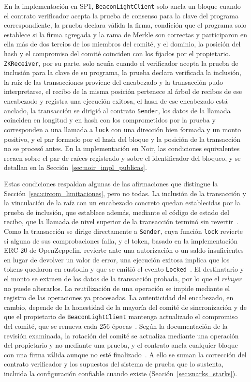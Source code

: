 En la implementación en SP1, \texttt{BeaconLightClient} solo ancla un bloque cuando el contrato
verificador acepta la prueba de consenso para la clave del programa correspondiente, la prueba declara válida la firma, condición
que el programa solo establece si la firma agregada y la rama de Merkle son correctas y
participaron en ella más de dos tercios de los miembros del comité, y el dominio, la posición del
hash y el compromiso del comité coinciden con los fijados por el propietario. \texttt{ZKReceiver}, por su parte, solo acuña cuando el verificador acepta la
prueba de inclusión para la clave de su programa, la prueba declara verificada la inclusión, la
raíz de las transacciones proviene del encabezado y la transacción pudo interpretarse, el recibo
de la misma posición pertenece al árbol de recibos de ese encabezado y registra una ejecución
exitosa, el hash de ese encabezado está anclado, la transacción se dirigió al contrato \texttt{Sender}, los datos de
la llamada coinciden en longitud y en hash con los comprometidos por la prueba y corresponden a
una llamada a \texttt{lock} con una dirección bien formada y un monto positivo, y el par formado
por el hash del bloque y la posición de la transacción no se procesó antes. En la implementación
en Noir, las condiciones equivalentes recaen sobre el par de raíces registrado y sobre el
identificador del bloqueo, y se detallan en la Sección~\ref{sec:noir_impl_publicas}.

Estas condiciones respaldan algunas de las afirmaciones que distingue la
Sección~\ref{sec:circom_limitaciones}, pero no todas. La inclusión de la transacción y la
vinculación de la raíz con un encabezado concreto quedan establecidas por la prueba de inclusión,
que establece además, mediante el código de estado del recibo, que la llamada de nivel superior
de la transacción terminó sin revertir~\cite{eip658}. Como la transacción se dirige directamente
a \texttt{Sender}, cuya función \texttt{lock} revierte si alguna de sus comprobaciones falla, y
el token, basado en la implementación ERC-20 de OpenZeppelin, revierte ante una autorización o un
saldo insuficientes en lugar de devolver un valor de error, una ejecución exitosa implica que los
tokens quedaron en custodia y que se emitió el evento \texttt{Locked}~\cite{zkguaranibridgesp1,
ozerc20}. El destinatario y el monto
se extraen de los datos de la transacción probada, por lo que el \textit{relayer} no puede
alterarlos. La reutilización de una operación se impide mediante el
registro de las operaciones ya procesadas. La autenticidad del encabezado, en cambio, depende de la
honestidad de la mayoría del comité de sincronización y de que el propietario de
\texttt{BeaconLightClient} mantenga actualizado el compromiso del comité, que se renueva cada 256
épocas~\cite{ethconsensusaltair}. Según la documentación de la revisión examinada, la rotación del
comité se actualiza mediante una operación del propietario y no mediante una prueba, y el contrato
ancla cualquier bloque con una firma válida aunque no esté finalizado~\cite{zkguaranibridgesp1}. A ello se suman la corrección del contrato verificador
y los supuestos del sistema de prueba que lo sustenta, incluida la configuración confiable cuando
existe (Sección~\ref{sec:snarks_starks}).

